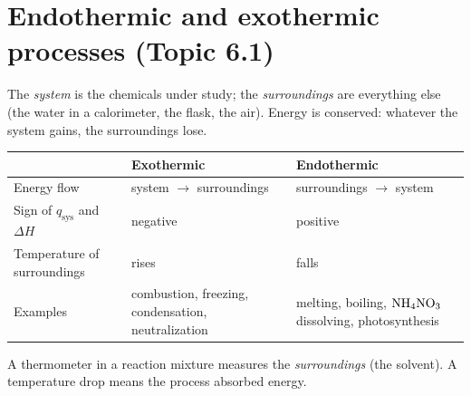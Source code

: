 \documentclass[11pt]{article}
\begin{document}
\titleblock
\begin{abstract}
This guide covers all of Unit 6, Thermochemistry, in ten sections: one for each of Topics 6.1--6.9 in course order, plus a final section on lab skills and free-response technique. Each section gives the definitions, equations and particle-level reasoning the topic needs, at least one worked example, the phrasing that earns free-response points and the mistakes that cost them. The worked examples use their own numbers, so none of them give away an item in \emph{Unit 6 Practice Set A} or \emph{Unit 6 Practice Set B}; the answer keys of both sets point back to the section numbers here. Plan on about 70 minutes for a full read with a calculator out.
\end{abstract}

\section{Endothermic and exothermic processes (Topic 6.1)}\label{t:6.1}
The \emph{system} is the chemicals under study; the \emph{surroundings} are everything else (the water in a calorimeter, the flask, the air). Energy is conserved: whatever the system gains, the surroundings lose.
\begin{center}
\begin{tabular}{lll}\toprule
& Exothermic & Endothermic \\ \midrule
Energy flow & system $\rightarrow$ surroundings & surroundings $\rightarrow$ system \\
Sign of $q_{\text{sys}}$ and $\Delta H$ & negative & positive \\
Temperature of surroundings & rises & falls \\
Examples & combustion, freezing, condensation, neutralization & melting, boiling, $\ce{NH4NO3}$ dissolving, photosynthesis \\ \bottomrule
\end{tabular}
\end{center}
A thermometer in a reaction mixture measures the \emph{surroundings} (the solvent). A temperature drop means the process absorbed energy.
\end{document}
